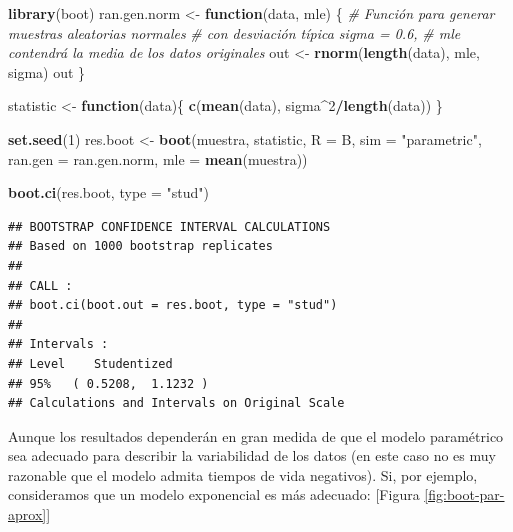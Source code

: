 \documentclass[]{book}
\newenvironment{Shaded}{\begin{snugshade}}{\end{snugshade}}
\newcommand{\KeywordTok}[1]{\textcolor[rgb]{0.13,0.29,0.53}{\textbf{#1}}}
\newcommand{\DataTypeTok}[1]{\textcolor[rgb]{0.13,0.29,0.53}{#1}}
\newcommand{\DecValTok}[1]{\textcolor[rgb]{0.00,0.00,0.81}{#1}}
\newcommand{\StringTok}[1]{\textcolor[rgb]{0.31,0.60,0.02}{#1}}
\newcommand{\CommentTok}[1]{\textcolor[rgb]{0.56,0.35,0.01}{\textit{#1}}}
\newcommand{\ControlFlowTok}[1]{\textcolor[rgb]{0.13,0.29,0.53}{\textbf{#1}}}
\newcommand{\OperatorTok}[1]{\textcolor[rgb]{0.81,0.36,0.00}{\textbf{#1}}}
\newcommand{\NormalTok}[1]{#1}
\theoremstyle{definition}
\theoremstyle{definition}
\theoremstyle{definition}
\theoremstyle{remark}
\begin{document}
\begin{Shaded}
\begin{Highlighting}[]
\KeywordTok{library}\NormalTok{(boot)}
\NormalTok{ran.gen.norm <-}\StringTok{ }\ControlFlowTok{function}\NormalTok{(data, mle) \{}
    \CommentTok{# Función para generar muestras aleatorias normales}
    \CommentTok{# con desviación típica sigma = 0.6,}
    \CommentTok{# mle contendrá la media de los datos originales}
\NormalTok{    out <-}\StringTok{ }\KeywordTok{rnorm}\NormalTok{(}\KeywordTok{length}\NormalTok{(data), mle, sigma)}
\NormalTok{    out}
\NormalTok{\}}

\NormalTok{statistic <-}\StringTok{ }\ControlFlowTok{function}\NormalTok{(data)\{}
    \KeywordTok{c}\NormalTok{(}\KeywordTok{mean}\NormalTok{(data), sigma}\OperatorTok{^}\DecValTok{2}\OperatorTok{/}\KeywordTok{length}\NormalTok{(data))}
\NormalTok{\}}

\KeywordTok{set.seed}\NormalTok{(}\DecValTok{1}\NormalTok{)}
\NormalTok{res.boot <-}\StringTok{ }\KeywordTok{boot}\NormalTok{(muestra, statistic, }\DataTypeTok{R =}\NormalTok{ B, }\DataTypeTok{sim =} \StringTok{"parametric"}\NormalTok{,}
                 \DataTypeTok{ran.gen =}\NormalTok{ ran.gen.norm, }\DataTypeTok{mle =} \KeywordTok{mean}\NormalTok{(muestra))}

\KeywordTok{boot.ci}\NormalTok{(res.boot, }\DataTypeTok{type =} \StringTok{"stud"}\NormalTok{)}
\end{Highlighting}
\end{Shaded}

\begin{verbatim}
## BOOTSTRAP CONFIDENCE INTERVAL CALCULATIONS
## Based on 1000 bootstrap replicates
## 
## CALL : 
## boot.ci(boot.out = res.boot, type = "stud")
## 
## Intervals : 
## Level    Studentized     
## 95%   ( 0.5208,  1.1232 )  
## Calculations and Intervals on Original Scale
\end{verbatim}

Aunque los resultados dependerán en gran medida de que el modelo
paramétrico sea adecuado para describir la variabilidad de los datos (en
este caso no es muy razonable que el modelo admita tiempos de vida
negativos). Si, por ejemplo, consideramos que un modelo exponencial es
más adecuado: {[}Figura \ref{fig:boot-par-aprox}{]}
\end{document}
